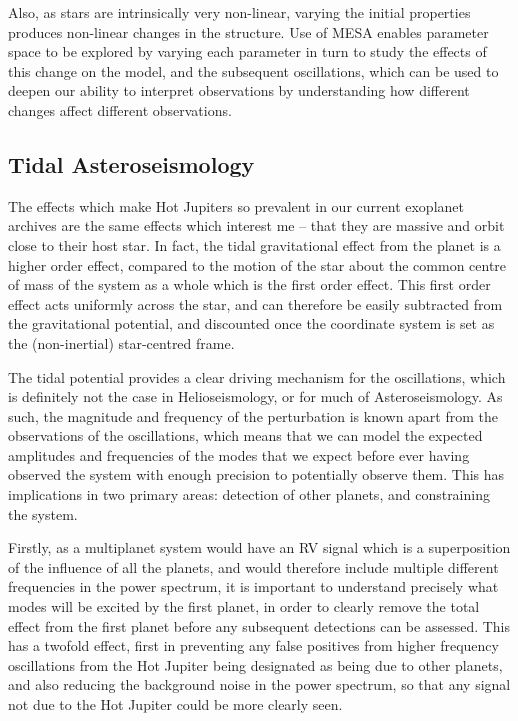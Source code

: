 \documentclass[11pt]{amsart}
\begin{document}
Also, as stars are intrinsically very non-linear, varying the initial properties produces non-linear changes in the structure.  Use of MESA enables parameter space to be explored by varying each parameter in turn to study the effects of this change on the model, and the subsequent oscillations, which can be used to deepen our ability to interpret observations by understanding how different changes affect different observations.







\subsection{Tidal Asteroseismology} \label{Intro:TidalAstero}

The effects which make Hot Jupiters so prevalent in our current exoplanet archives are the same effects which interest me -- that they are massive and orbit close to their host star.  In fact, the tidal gravitational effect from the planet is a higher order effect, compared to the motion of the star about the common centre of mass of the system as a whole which is the first order effect.  This first order effect acts uniformly across the star, and can therefore be easily subtracted from the gravitational potential, and discounted once the coordinate system is set as the (non-inertial) star-centred frame.

The tidal potential provides a clear driving mechanism for the oscillations, which is definitely not the case in Helioseismology, or for much of Asteroseismology.  As such, the magnitude and frequency of the perturbation is known apart from the observations of the oscillations, which means that we can model the expected amplitudes and frequencies of the modes that we expect before ever having observed the system with enough precision to potentially observe them.  This has implications in two primary areas: detection of other planets, and constraining the system.

Firstly, as a multiplanet system would have an RV signal which is a superposition of the influence of all the planets, and would therefore include multiple different frequencies in the power spectrum, it is important to understand precisely what modes will be excited by the first planet, in order to clearly remove the total effect from the first planet before any subsequent detections can be assessed.  This has a twofold effect, first in preventing any false positives from higher frequency oscillations from the Hot Jupiter being designated as being due to other planets, and also reducing the background noise in the power spectrum, so that any signal not due to the Hot Jupiter could be more clearly seen.
\end{document}
